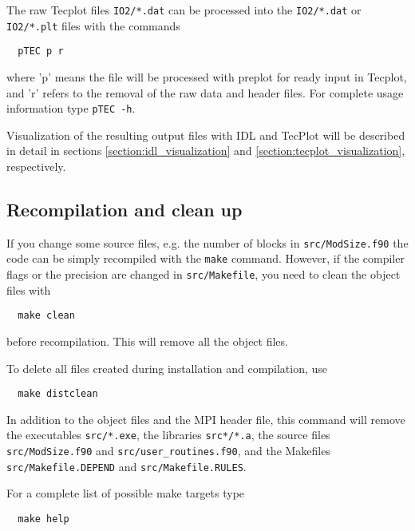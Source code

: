 The raw Tecplot files {\tt IO2/*.dat} can be processed
into the {\tt IO2/*.dat} or {\tt IO2/*.plt} files
with the commands
\begin{verbatim}
  pTEC p r
\end{verbatim}
where 'p' means the file will be processed with preplot for ready input
in Tecplot, and 'r' refers to the removal of the raw data and header
files.  For complete usage information type {\tt pTEC -h}.

Visualization of the resulting output files with IDL and TecPlot
will be described in detail in sections \ref{section:idl_visualization}
and \ref{section:tecplot_visualization}, respectively.

\subsection{Recompilation and clean up}

If you change some source files, e.g. the number of blocks
in {\tt src/ModSize.f90} the code can be simply recompiled
with the {\tt make} command. However, if the compiler flags or the
precision are changed in {\tt src/Makefile}, you need to clean the
object files with
\begin{verbatim}
  make clean
\end{verbatim}
before recompilation. This will remove all the object files.

To delete all files created during installation and compilation, use
\begin{verbatim}
  make distclean
\end{verbatim}
In addition to the object files and the MPI header file, 
this command will remove the executables {\tt src/*.exe}, 
the libraries {\tt src*/*.a}, the source files
{\tt src/ModSize.f90} and {\tt src/user\_routines.f90}, 
and the Makefiles {\tt src/Makefile.DEPEND} and {\tt src/Makefile.RULES}.

For a complete list of possible make targets type
\begin{verbatim}
  make help
\end{verbatim}
